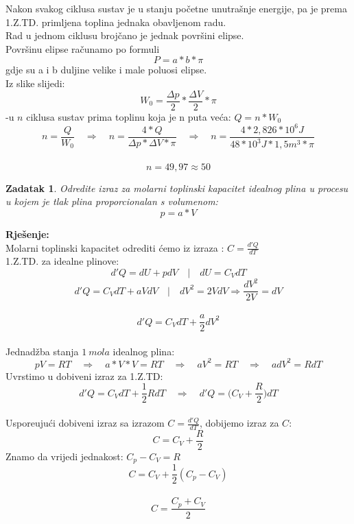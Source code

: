 \documentclass[a4paper,12pt]{article}
\newtheorem{ZDK}{Zadatak}[section]
\begin{document}
Nakon svakog ciklusa sustav je u stanju po\v{c}etne unutra\v{s}nje energije, pa je prema 1.Z.TD. primljena toplina jednaka obavljenom radu. \\
Rad u jednom ciklusu broj\v{c}ano je jednak povr\v{s}ini elipse.\\
\newline
Povr\v{s}inu elipse ra\v{c}unamo po formuli
$$ P=a*b*\pi $$
gdje su a i b duljine velike i male poluosi elipse. \\
Iz slike slijedi:
$$ W_0=\frac{\Delta p}{2}*\frac{\Delta V}{2}*\pi $$
-u $n$ ciklusa sustav prima toplinu koja je n puta ve\'ca: $Q=n*W_0$
$$ n=\frac{Q}{W_0} \quad \Rightarrow \quad n=\frac{4*Q}{\Delta p*\Delta V*\pi} \quad \Rightarrow \quad n=\frac{4*2,826*10^6J}{48*10^3J*1,5m^3*\pi} $$
\\
$$ n=49,97 \approx 50 $$
\newpage
\begin{ZDK}
	Odredite izraz za molarni toplinski kapacitet idealnog plina u procesu u kojem je tlak plina proporcionalan s volumenom:
	$$ p=a*V $$
\end{ZDK}
\textbf{Rje\v{s}enje:} \\
\newline
Molarni toplinski kapacitet odrediti \'cemo iz izraza : $C=\frac{d'Q}{dT}$
\\
\newline
1.Z.TD. za idealne plinove: 
$$ d'Q=dU+pdV \quad \Big| \quad dU=C_VdT $$
$$ d'Q=C_VdT+aVdV \quad \Big| \quad dV^2=2VdV \Rightarrow \frac{dV^2}{2V}=dV $$
\\
$$ d'Q=C_VdT+ \frac{a}{2}dV^2  $$
\\
Jednad\v{z}ba stanja $1\ mola$ idealnog plina:
$$ pV=RT \quad \Rightarrow \quad  a*V*V=RT \quad \Rightarrow \quad aV^2=RT \quad \Rightarrow \quad adV^2=RdT $$
Uvrstimo u dobiveni izraz za 1.Z.TD:
$$ d'Q=C_VdT+\frac{1}{2}RdT \quad \Rightarrow \quad d'Q=\Big( C_V+\frac{R}{2} \Big)dT $$
\\
Uspore\dj uju\'ci dobiveni izraz sa izrazom $C=\frac{d'Q}{dT} $, dobijemo izraz za $C$:
$$ C=C_V+\frac{R}{2} $$
Znamo da vrijedi jednakost: $C_p-C_V=R$ 
\\
$$ C=C_V+\frac{1}{2}(C_p-C_V) $$
\\
$$ C=\frac{C_p+C_V}{2} $$
\end{document}
